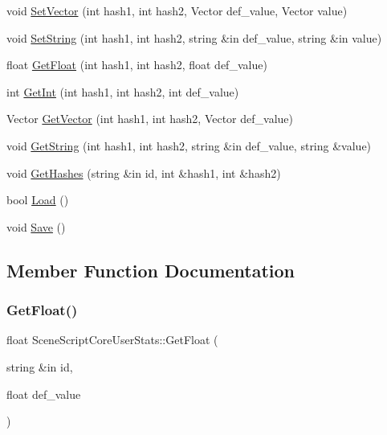 \begin{DoxyCompactItemize}
\item 
void \hyperlink{class_scene_script_core_user_stats_ab3781d10c4efa2427cb10eb729d5eeca}{Set\+Vector} (int hash1, int hash2, Vector def\+\_\+value, Vector value)
\item 
void \hyperlink{class_scene_script_core_user_stats_a7b67627067c5468f10d5ff30ea72885d}{Set\+String} (int hash1, int hash2, string \&in def\+\_\+value, string \&in value)
\item 
float \hyperlink{class_scene_script_core_user_stats_a7c4abde9412dda6a94fed7f788e97c72}{Get\+Float} (int hash1, int hash2, float def\+\_\+value)
\item 
int \hyperlink{class_scene_script_core_user_stats_a325474f572b52d51a7b041458160edc9}{Get\+Int} (int hash1, int hash2, int def\+\_\+value)
\item 
Vector \hyperlink{class_scene_script_core_user_stats_a181e9b1e117c32e17aa3dcecb9083503}{Get\+Vector} (int hash1, int hash2, Vector def\+\_\+value)
\item 
void \hyperlink{class_scene_script_core_user_stats_ac1b0f3cb7e0d9051954697a0bd44552b}{Get\+String} (int hash1, int hash2, string \&in def\+\_\+value, string \&value)
\item 
void \hyperlink{class_scene_script_core_user_stats_ae37d1954784e2208425addc7d0db994c}{Get\+Hashes} (string \&in id, int \&hash1, int \&hash2)
\item 
bool \hyperlink{class_scene_script_core_user_stats_ab7db51657229f2fea600e1653ba92a57}{Load} ()
\item 
void \hyperlink{class_scene_script_core_user_stats_a88518dbb9e31e82210d2c3413b11eb72}{Save} ()
\end{DoxyCompactItemize}


\subsection{Member Function Documentation}
\hypertarget{class_scene_script_core_user_stats_a29d0ac5914ccd6fe9ff777f24439b61a}{}\label{class_scene_script_core_user_stats_a29d0ac5914ccd6fe9ff777f24439b61a} 
\subsubsection{\texorpdfstring{Get\+Float()}{GetFloat()}\hspace{0.1cm}{\footnotesize\ttfamily [1/2]}}
{\footnotesize\ttfamily float Scene\+Script\+Core\+User\+Stats\+::\+Get\+Float (\begin{DoxyParamCaption}\item[{string \&in}]{id,  }\item[{float}]{def\+\_\+value }\end{DoxyParamCaption})}

